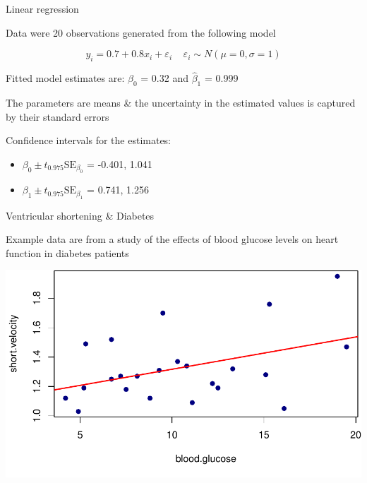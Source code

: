 \documentclass[10pt,ignorenonframetext,compress, aspectratio=169]{beamer}
\providecommand{\tightlist}{%
  \setlength{\itemsep}{0pt}\setlength{\parskip}{0pt}}
\begin{document}
\begin{frame}{Linear regression}

Data were 20 observations generated from the following model

\[y_i = 0.7 + 0.8x_i + \varepsilon_i \;\;\;\; \varepsilon_i \sim N(\mu = 0, \sigma = 1)\]

Fitted model estimates are: \(\hat{\beta}_0\) = 0.32 and
\(\hat{\beta}_1\) = 0.999

The parameters are means \& the uncertainty in the estimated values is
captured by their standard errors

Confidence intervals for the estimates:

\begin{itemize}
\tightlist
\item
  \(\beta_0 \pm t_{0.975} \mathrm{SE}_{\beta_0}\) = -0.401, 1.041
\item
  \(\beta_1 \pm t_{0.975} \mathrm{SE}_{\beta_1}\) = 0.741, 1.256
\end{itemize}

\end{frame}

\begin{frame}{Ventricular shortening \& Diabetes}

Example data are from a study of the effects of blood glucose levels on
heart function in diabetes patients

\begin{center}\includegraphics[width=0.7\linewidth]{03-linear-models_files/figure-beamer/thuesen-example-1} \end{center}

\end{frame}
\end{document}
